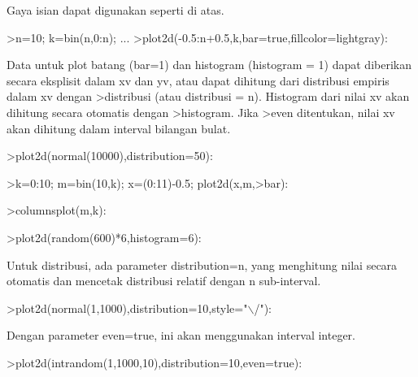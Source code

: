 \documentclass[a4paper,10pt]{article}
\begin{document}
\begin{eulernotebook}
\begin{eulercomment}
\begin{eulercomment}
\begin{eulercomment}
\begin{eulercomment}
\begin{eulercomment}
\begin{eulercomment}
\begin{eulercomment}
\begin{eulercomment}
\begin{eulercomment}
\begin{eulercomment}
\begin{eulercomment}
Gaya isian dapat digunakan seperti di atas.
\end{eulercomment}
\begin{eulerprompt}
>n=10; k=bin(n,0:n); ...
>plot2d(-0.5:n+0.5,k,bar=true,fillcolor=lightgray):
\end{eulerprompt}
\begin{eulercomment}
Data untuk plot batang (bar=1) dan histogram (histogram = 1) dapat
diberikan secara eksplisit dalam xv dan yv, atau dapat dihitung dari
distribusi empiris dalam xv dengan \textgreater{}distribusi (atau distribusi = n).
Histogram dari nilai xv akan dihitung secara otomatis dengan
\textgreater{}histogram. Jika \textgreater{}even ditentukan, nilai xv akan dihitung dalam
interval bilangan bulat.
\end{eulercomment}
\begin{eulerprompt}
>plot2d(normal(10000),distribution=50):
\end{eulerprompt}
\begin{eulerprompt}
>k=0:10; m=bin(10,k); x=(0:11)-0.5; plot2d(x,m,>bar):
\end{eulerprompt}
\begin{eulerprompt}
>columnsplot(m,k):
\end{eulerprompt}
\begin{eulerprompt}
>plot2d(random(600)*6,histogram=6):
\end{eulerprompt}
\begin{eulercomment}
Untuk distribusi, ada parameter distribution=n, yang menghitung nilai
secara otomatis dan mencetak distribusi relatif dengan n sub-interval.
\end{eulercomment}
\begin{eulerprompt}
>plot2d(normal(1,1000),distribution=10,style="\(\backslash\)/"):
\end{eulerprompt}
\begin{eulercomment}
Dengan parameter even=true, ini akan menggunakan interval integer.
\end{eulercomment}
\begin{eulerprompt}
>plot2d(intrandom(1,1000,10),distribution=10,even=true):
\end{eulerprompt}

\end{eulercomment}
\end{eulercomment}
\end{eulercomment}
\end{eulercomment}
\end{eulercomment}
\end{eulercomment}
\end{eulercomment}
\end{eulercomment}
\end{eulercomment}
\end{eulercomment}
\end{eulernotebook}
\end{document}
